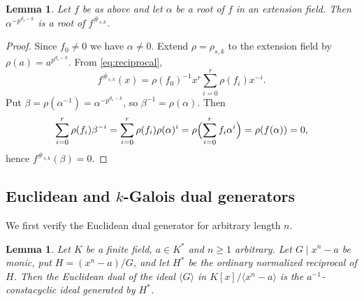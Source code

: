 \documentclass[11pt,a4paper]{article}
\numberwithin{equation}{section}
\theoremstyle{plain}
\newtheorem{lemma}[theorem]{Lemma}
\theoremstyle{definition}
\theoremstyle{remark}
\begin{document}
\begin{lemma}\label{lem:root-action}
Let $f$ be as above and let $\alpha$ be a root of $f$ in an extension field.
Then $\alpha^{-p^{d_s-k}}$ is a root of $f^{\#_{s,k}}$.
\end{lemma}

\begin{proof}
Since $f_0\neq0$ we have $\alpha\neq0$.  Extend $\rho=\rho_{s,k}$ to the
extension field by $\rho(a)=a^{p^{d_s-k}}$.  From \eqref{eq:reciprocal},
\[
f^{\#_{s,k}}(x)=\rho(f_0)^{-1}x^r\sum_{i=0}^{r}\rho(f_i)x^{-i}.
\]
Put $\beta=\rho(\alpha^{-1})=\alpha^{-p^{d_s-k}}$, so
$\beta^{-1}=\rho(\alpha)$.  Then
\[
\sum_{i=0}^{r}\rho(f_i)\beta^{-i}
   =\sum_{i=0}^{r}\rho(f_i)\rho(\alpha)^i
   =\rho\Bigl(\sum_{i=0}^{r}f_i\alpha^i\Bigr)=\rho(f(\alpha))=0,
\]
hence $f^{\#_{s,k}}(\beta)=0$.
\end{proof}

\subsection{Euclidean and \texorpdfstring{$k$}{k}-Galois dual
generators}\label{sec:dual-generators}

We first verify the Euclidean dual generator for arbitrary length $n$.

\begin{lemma}\label{lem:euclidean-dual}
Let $K$ be a finite field, $a\in K^\ast$ and $n\geq1$ arbitrary.  Let
$G\mid x^n-a$ be monic, put $H=(x^n-a)/G$, and let $H^\ast$ be the ordinary
normalized reciprocal of $H$.  Then the Euclidean dual of the ideal
$\langle G\rangle$ in $K[x]/\langle x^n-a\rangle$ is the
$a^{-1}$-constacyclic ideal generated by $H^\ast$.
\end{lemma}
\end{document}
